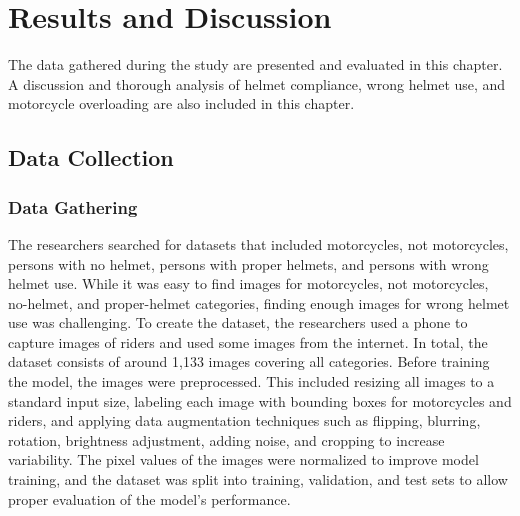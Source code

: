 
\chapter{Results and Discussion}
\begin{refsection}

The data gathered during the study are presented and evaluated in this chapter. A discussion and thorough analysis of helmet compliance, wrong helmet use, and motorcycle overloading are also included in this chapter.
\begin{refsection}

\section{Data Collection}
\subsection{Data Gathering}
The researchers searched for datasets that included motorcycles, not motorcycles, persons with no helmet, persons with proper helmets, and persons with wrong helmet use. While it was easy to find images for motorcycles, not motorcycles, no-helmet, and proper-helmet categories, finding enough images for wrong helmet use was challenging. To create the dataset, the researchers used a phone to capture images of riders and used some images from the internet. In total, the dataset consists of around 1,133 images covering all categories. Before training the model, the images were preprocessed. This included resizing all images to a standard input size, labeling each image with bounding boxes for motorcycles and riders, and applying data augmentation techniques such as flipping, blurring, rotation, brightness adjustment, adding noise, and cropping to increase variability. The pixel values of the images were normalized to improve model training, and the dataset was split into training, validation, and test sets to allow proper evaluation of the model’s performance.


\end{refsection}
\end{refsection}
